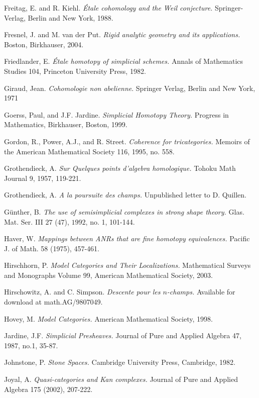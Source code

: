 \documentclass{report}[10pt, final]
\theoremstyle{definition}
\begin{document}
\begin{EndMatter}
\begin{thebibliography}{99}
 Freitag, E. and R. Kiehl. {\it \'{E}tale cohomology and the Weil conjecture.} Springer-Verlag, Berlin and New York, 1988.

 Fresnel, J. and M. van der Put. {\it Rigid analytic geometry and its applications.} Boston, Birkhauser, 2004. 

 Friedlander, E. {\it \'{E}tale homotopy of simplicial schemes.} Annals of Mathematics Studies  104, Princeton University Press, 1982.

 Giraud, Jean. {\it Cohomologie non abelienne}.
Springer Verlag, Berlin and New York, 1971

 Goerss, Paul, and J.F. Jardine. {\it Simplicial Homotopy Theory.} Progress in Mathematics, Birkhauser, Boston, 1999.

 Gordon, R., Power, A.J., and R. Street.
{\it Coherence for tricategories.} Memoirs of the American
Mathematical Society 116, 1995, no. 558.

 Grothendieck, A. {\it Sur Quelques points
d'algebra homologique.} Tohoku Math Journal 9, 1957, 119-221.

 Grothendieck, A. {\it A la poursuite des champs.} Unpublished letter to
D. Quillen.

 G\"{u}nther, B. {\it The use of semisimplicial
complexes in strong shape theory.} Glas. Mat. Ser. III $27$ ($47$), $1992$, no. 1, 101-144.

 Haver, W. {\it Mappings between ANRs that are fine homotopy equivalences.} Pacific J. of Math. 58 (1975), 457-461.

 Hirschhorn, P. {\it Model Categories and Their Localizations.} Mathematical Surveys and Monographs Volume 99, American Mathematical Society, 2003. 

 Hirschowitz, A. and C. Simpson. {\it Descente pour les $n$-champs.} Available for download at math.AG/9807049.

 Hovey, M. {\it Model Categories.} American Mathematical Society, 1998.

 Jardine, J.F. {\it Simplicial Presheaves.} Journal
of Pure and Applied Algebra 47, 1987, no.1, 35-87.

 Johnstone, P. {\it Stone Spaces.}
Cambridge University Press, Cambridge, 1982.

 Joyal, A. {\it Quasi-categories and Kan
complexes.} Journal of Pure and Applied Algebra 175 (2002),
207-222.


\end{thebibliography}
\end{EndMatter}
\end{document}
